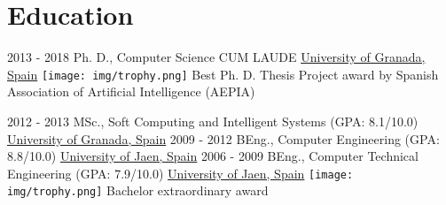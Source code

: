 \documentclass[letterpaper]{twentysecondcv} %
\begin{document}
\makeprofile %

\section{Education}

\begin{twenty} %
	\twentyitem
    	{2013 - 2018}
        {}
        {Ph. D., Computer Science \textnormal{CUM LAUDE}}
        {\href{http://www.ugr.es/}{University of Granada, Spain}}
        {{\texttt{[image: img/trophy.png]}} Best Ph. D. Thesis Project award by Spanish Association of
Artificial Intelligence (AEPIA)}
        {}
	
	\twentyitem
    	{2012 - 2013}
        {}
        {MSc., Soft Computing and Intelligent Systems \textnormal{(GPA: 8.1/10.0)}}
        {\href{http://www.ugr.es/}{University of Granada, Spain}}
        {}
        {}
	\twentyitem
    	{2009 - 2012}
		{}
        {BEng., Computer Engineering \textnormal{(GPA: 8.8/10.0)}}
        {\href{http://www.ujaen.es/}{University of Jaen, Spain}}
        {}
        {}
   \twentyitem
    	{2006 - 2009}
		{}
        {BEng., Computer Technical Engineering \textnormal{(GPA: 7.9/10.0)}}
        {\href{http://www.ujaen.es/}{University of Jaen, Spain}}
        {{\texttt{[image: img/trophy.png]}} Bachelor extraordinary award}
        {}
\end{twenty}

\end{document}
